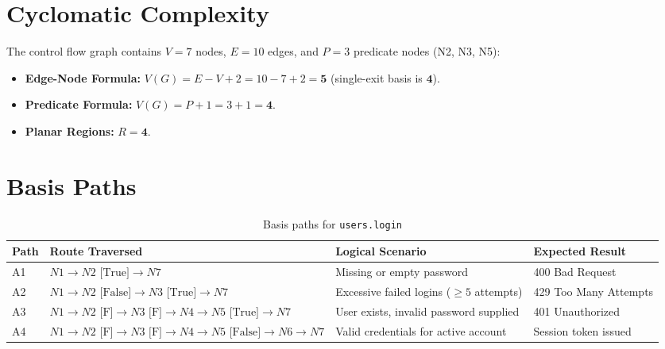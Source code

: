 \documentclass[12pt, a4paper]{report}
\begin{document}
\section{Cyclomatic Complexity}
The control flow graph contains $V = 7$ nodes, $E = 10$ edges, and $P = 3$ predicate nodes (N2, N3, N5):
\begin{itemize}[leftmargin=1.5em]
  \item \textbf{Edge-Node Formula:} $V(G) = E - V + 2 = 10 - 7 + 2 = \mathbf{5}$ (single-exit basis is $\mathbf{4}$).
  \item \textbf{Predicate Formula:} $V(G) = P + 1 = 3 + 1 = \mathbf{4}$.
  \item \textbf{Planar Regions:} $R = \mathbf{4}$.
\end{itemize}

\section{Basis Paths}
\begin{table}[H]
\centering
\footnotesize
\begin{tabularx}{\textwidth}{L{1.2cm} L{5.8cm} L{5.5cm} L{2.8cm}}
\toprule
\textbf{Path} & \textbf{Route Traversed} & \textbf{Logical Scenario} & \textbf{Expected Result} \\
\midrule
A1 & $N1 \to N2\text{ [True]} \to N7$ & Missing or empty password & 400 Bad Request \\
A2 & $N1 \to N2\text{ [False]} \to N3\text{ [True]} \to N7$ & Excessive failed logins ($\ge 5$ attempts) & 429 Too Many Attempts \\
A3 & $N1 \to N2\text{ [F]} \to N3\text{ [F]} \to N4 \to N5\text{ [True]} \to N7$ & User exists, invalid password supplied & 401 Unauthorized \\
A4 & $N1 \to N2\text{ [F]} \to N3\text{ [F]} \to N4 \to N5\text{ [False]} \to N6 \to N7$ & Valid credentials for active account & Session token issued \\
\bottomrule
\end{tabularx}
\caption{Basis paths for \texttt{users.login}}
\label{tab:paths_1a}
\end{table}
\end{document}
